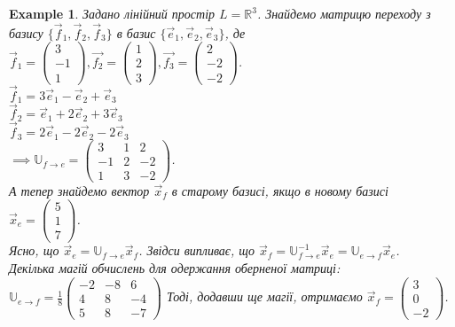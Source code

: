 \documentclass[a4paper, 10pt]{article}
\theoremstyle{theoremdd}
\newtheorem{example}[theorem]{Example}
\begin{document}
\begin{example} Задано лінійний простір $L = \mathbb{R}^3$. Знайдемо матрицю переходу з базису $\{\vec{f}_1,\vec{f}_2,\vec{f}_3\}$ в базис $\{\vec{e}_1,\vec{e}_2, \vec{e}_3\}$, де\\
$\vec{f}_1 = \begin{pmatrix}
3 \\ -1 \\ 1
\end{pmatrix}, \vec{f_2} = \begin{pmatrix}
1 \\ 2 \\ 3
\end{pmatrix}, \vec{f_3} = \begin{pmatrix}
2 \\ -2 \\ -2
\end{pmatrix}$.\\
$\vec{f}_1 = 3\vec{e}_1 -\vec{e}_2 + \vec{e}_3$\\
$\vec{f}_2 = \vec{e}_1 +2\vec{e}_2 + 3\vec{e}_3$\\
$\vec{f}_3 = 2\vec{e}_1 -2\vec{e}_2 -2\vec{e}_3$\\
$\implies \mathbb{U}_{f \to e} = \begin{pmatrix}
3 & 1 & 2 \\
-1 & 2 & -2 \\
1 & 3 & -2
\end{pmatrix}$.
\bigskip \\
А тепер знайдемо вектор $\vec{x}_f$ в старому базисі, якщо в новому базисі $\vec{x}_e = \begin{pmatrix}
 5 \\ 1 \\ 7
\end{pmatrix}$.\\
Ясно, що $\vec{x}_e = \mathbb{U}_{f \to e}\vec{x}_f$. Звідси випливає, що $\vec{x}_f = \mathbb{U}^{-1}_{f \to e} \vec{x}_e = \mathbb{U}_{e \to f} \vec{x}_e$.\\
Декілька магій обчислень для одержання оберненої матриці:\\
$\mathbb{U}_{e \to f} = \displaystyle \frac{1}{8} \begin{pmatrix}
-2 & -8 & 6 \\
4 & 8 & -4 \\
5 & 8 & -7
\end{pmatrix}$
Тоді, додавши ще магії, отримаємо $\vec{x}_f = \begin{pmatrix}
3 \\ 0 \\ -2
\end{pmatrix}$.
\end{example}
\end{document}
